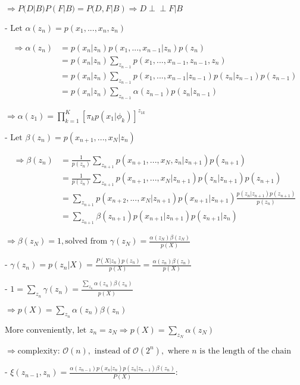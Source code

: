           $\Rightarrow P(D|B)P(F|B) = P(D,F|B) \Rightarrow D \perp\!\!\!\perp F | B$ 

     - $\text{Let }\alpha(z_n) = p(x_1,...,x_n,z_n)$ 

       \begin{align} \Rightarrow \alpha(z_n) &= p(x_n|z_n)p(x_1,...,x_{n-1}|z_n)p(z_n) \\ &= \displaystyle p(x_n|z_n)\sum_{z_{n-1}}p(x_1,...,x_{n-1},z_{n-1},z_n) \\ &= p(x_n|z_n) \sum_{z_{n-1}} p(x_1,...,x_{n-1}|z_{n-1})p(z_n|z_{n-1})p(z_{n-1}) \\ &= p(x_n|z_n) \sum_{z_{n-1}}\alpha(z_{n-1}) p(z_n|z_{n-1}) \end{align}

       $\displaystyle \Rightarrow \alpha(z_1) = \prod_{k=1}^K [\pi_k p(x_1|\phi_k)]^{z_{1k}}$ 

     - $\text{Let } \beta(z_n) = p(x_{n+1},...,x_N|z_n)$ 

       \begin{align} \displaystyle \Rightarrow \beta(z_n) &= \frac 1 {p(z_n)} \sum_{z_{n+1}}p(x_{n+1}, ..., x_N, z_n | z_{n+1}) p(z_{n+1}) \\ &= \frac 1 {p(z_n)} \sum_{z_{n+1}}p(x_{n+1}, ..., x_N | z_{n+1})p(z_n | z_{n+1}) p(z_{n+1})  \\ &= \sum_{z_{n+1}}p(x_{n+2},...,x_N|z_{n+1})p(x_{n+1}|z_{n+1}) \frac{p(z_n|z_{n+1})p(z_{n+1}) }{p(z_n)} \\ &= \sum_{z_{n+1}} \beta(z_{n+1}) p(x_{n+1} | z_{n+1}) p(z_{n+1}|z_n) \end{align}

       $\Rightarrow \beta(z_N) = 1, \text{solved from } \gamma(z_N) =  \frac{\alpha(z_N)\beta(z_N)}{p(X)}$ 

     - $\displaystyle \gamma(z_n) = p(z_n|X) = \frac{P(X|z_n)p(z_n)} {p(X)} = \frac{\alpha(z_n) \beta(z_n)}{p(X)}$ 

     - $\displaystyle 1 = \sum_{z_n}\gamma(z_n) = \frac{\sum_{z_n} \alpha(z_n)\beta(z_n)}{p(X)}$ 

       $\displaystyle \Rightarrow p(X) = \sum_{z_n} \alpha(z_n)\beta(z_n)$ 

       $\text{More conveniently, let } \displaystyle z_n=z_N \Rightarrow p(X)=\sum_{z_N}\alpha(z_N)$

       $\Rightarrow \text{complexity: } \mathcal O(n), \text{ instead of } \mathcal O(2^n), \text{ where } n \text{ is the length of the chain}$ 

     - $\displaystyle \xi(z_{n-1}, z_n) = \frac {\alpha(z_{n-1})p(x_n|z_n)p(z_n|z_{n-1})\beta(z_n)} {P(X)}:$ 

